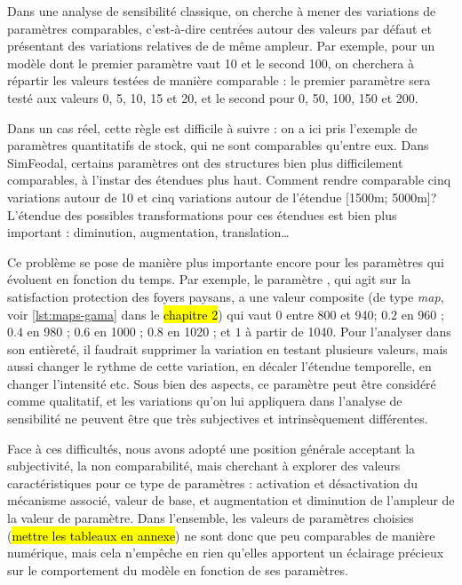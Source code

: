 Dans une analyse de sensibilité classique, on cherche à mener des variations de paramètres comparables, c'est-à-dire centrées autour des valeurs par défaut et présentant des variations relatives de de même ampleur.
Par exemple, pour un modèle dont le premier paramètre vaut 10 et le second 100, on cherchera à répartir les valeurs testées de manière comparable : 
le premier paramètre sera testé aux valeurs 0, 5, 10, 15 et 20, et le second pour 0, 50, 100, 150 et 200.

Dans un cas réel, cette règle est difficile à suivre : on a ici pris l'exemple de paramètres quantitatifs \og de stock\fg{}, qui ne sont comparables qu'entre eux.
Dans SimFeodal, certains paramètres ont des structures bien plus difficilement comparables, à l'instar des étendues plus haut.
Comment rendre comparable cinq variations autour de 10 et cinq variations autour de l'étendue [1500m; 5000m]?
L'étendue des possibles transformations pour ces étendues est bien plus important : diminution, augmentation, translation\ldots

Ce problème se pose de manière plus importante encore pour les paramètres qui évoluent en fonction du temps.
Par exemple, le paramètre , qui agit sur la satisfaction protection des foyers paysans, a une valeur composite (de type \textit{map}, voir \cref{lst:maps-gama} dans le \hl{chapitre 2}) qui vaut \og $0$ entre 800 et 940; $0.2$ en 960 ; $0.4$ en 980 ; $0.6$ en 1000 ; $0.8$ en 1020 ; et $1$ à partir de 1040\fg{}.
Pour l'analyser dans son entièreté, il faudrait supprimer la variation en testant plusieurs valeurs, mais aussi changer le rythme de cette variation, en décaler l'étendue temporelle, en changer l'intensité etc.
Sous bien des aspects, ce paramètre peut être considéré comme qualitatif, et les variations qu'on lui appliquera dans l'analyse de sensibilité ne peuvent être que très subjectives et intrinsèquement différentes.

Face à ces difficultés, nous avons adopté une position générale acceptant la subjectivité, la non comparabilité, mais cherchant à explorer des valeurs \og caractéristiques\fg{} pour ce type de paramètres : activation et désactivation du mécanisme associé, valeur de base, et augmentation et diminution de l'ampleur de la valeur de paramètre.
Dans l'ensemble, les valeurs de paramètres choisies (\hl{mettre les tableaux en annexe}) ne sont donc que peu comparables de manière numérique, mais cela n'empêche en rien qu'elles apportent un éclairage précieux sur le comportement du modèle en fonction de ses paramètres.

